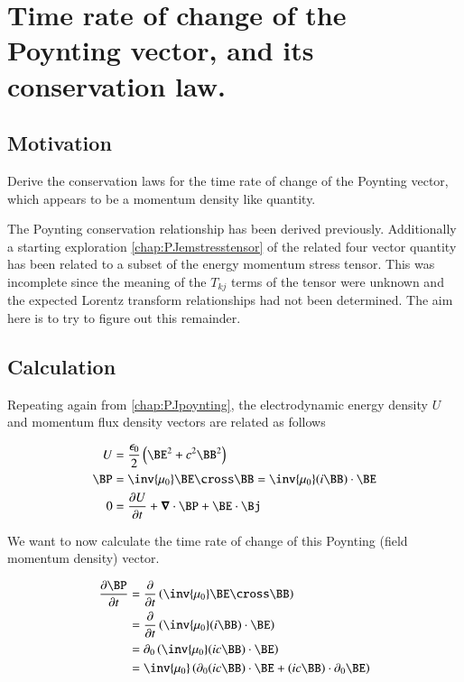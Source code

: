 \chapter{Time rate of change of the Poynting vector, and its conservation law.}\label{chap:PJpoyntingRate}

\section{Motivation }

Derive the conservation laws for the time rate of change of the Poynting vector, which appears to be a momentum density like quantity.

The Poynting conservation relationship has been derived previously.  Additionally a starting
exploration
\ref{chap:PJemstresstensor}
of the related four vector quantity has been related to a subset of the energy momentum stress tensor.
This was incomplete since the meaning of the $T_{kj}$ terms of the tensor were unknown and the expected
Lorentz transform relationships had not been determined.  The aim here is to try to figure out this remainder.

\section{Calculation }

Repeating again from \ref{chap:PJpoynting}, the electrodynamic energy density $U$ and momentum flux density vectors are related as follows

\begin{align}\label{eqn:poynting_rate:fromPoyntingNotes}
U &= \frac{\epsilon_0}{2}\left( \BE^2 + c^2 \BB^2 \right) \\
\BP &= \inv{\mu_0}\BE \cross \BB = \inv{\mu_0} (i \BB) \cdot \BE \\
0 &= \PD{t}{U} + \spacegrad \cdot \BP + \BE \cdot \Bj
\end{align}

We want to now calculate the time rate of change of this Poynting (field momentum density) vector.

\begin{align*}
\PD{t}{\BP}
&= \PD{t}{} \left( \inv{\mu_0} \BE \cross \BB \right) \\
&= \PD{t}{} \left( \inv{\mu_0}(i\BB) \cdot \BE \right) \\
&= \partial_0 \left( \inv{\mu_0}(i c\BB) \cdot \BE \right) \\
&= \inv{\mu_0} \left( \partial_0 (i c\BB) \cdot \BE  + (i c\BB) \cdot \partial_0 \BE  \right)
\end{align*}

